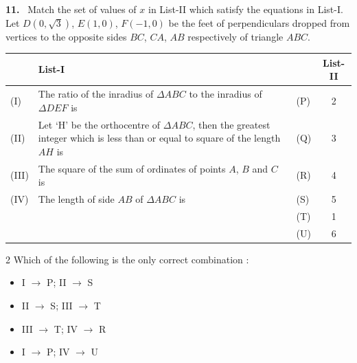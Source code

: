 \documentclass[10pt]{extarticle}
\newcommand{\qn}[1]{\par\smallskip\noindent\textbf{#1.}~}
\newenvironment{qoptions}{\begin{itemize}[leftmargin=1.8em,itemsep=1pt,topsep=2pt,label={}]}{\end{itemize}}
\newcommand{\opt}[2]{\item[(#1)] #2}
\begin{document}
\noindent\begin{minipage}{\textwidth}
\qn{11} Match the set of values of $x$ in List-II which satisfy the equations in List-I.\\ Let $D(0,\sqrt3)$, $E(1,0)$, $F(-1,0)$ be the feet of perpendiculars dropped from vertices to the opposite sides $BC$, $CA$, $AB$ respectively of triangle $ABC$.\par\smallskip
\begin{center}\small\renewcommand{\arraystretch}{1.25}\setlength{\tabcolsep}{4pt}
\begin{tabular}{|l|p{10.5cm}|l|c|}
\hline & \textbf{List-I} & & \textbf{List-II} \\\hline
(I) & The ratio of the inradius of $\Delta ABC$ to the inradius of $\Delta DEF$ is & (P) & 2 \\\hline
(II) & Let `H' be the orthocentre of $\Delta ABC$, then the greatest integer which is less than or equal to square of the length $AH$ is & (Q) & 3 \\\hline
(III) & The square of the sum of ordinates of points $A$, $B$ and $C$ is & (R) & 4 \\\hline
(IV) & The length of side $AB$ of $\Delta ABC$ is & (S) & 5 \\\hline
 &  & (T) & 1 \\\hline
 &  & (U) & 6 \\\hline
\end{tabular}
\end{center}
\end{minipage}
\begin{multicols}{2}
Which of the following is the only correct combination :
\begin{qoptions}
\opt{A}{I $\to$ P; II $\to$ S}
\opt{B}{II $\to$ S; III $\to$ T}
\opt{C}{III $\to$ T; IV $\to$ R}
\opt{D}{I $\to$ P; IV $\to$ U}
\end{qoptions}
\end{multicols}
\end{document}
